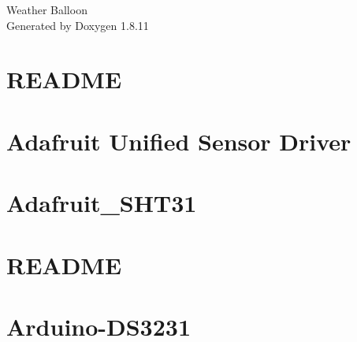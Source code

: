 \documentclass[twoside]{book}
\newcommand{\+}{\discretionary{\mbox{\scriptsize$\hookleftarrow$}}{}{}}
\newcommand{\clearemptydoublepage}{%
  \newpage{\pagestyle{empty}\cleardoublepage}%
}
\begin{document}
\hypersetup{pageanchor=false,
             bookmarksnumbered=true,
             pdfencoding=unicode
            }
\begin{titlepage}
\vspace*{7cm}
\begin{center}%
{\Large Weather Balloon }\\
\vspace*{1cm}
{\large Generated by Doxygen 1.8.11}\\
\end{center}
\end{titlepage}
\clearemptydoublepage
\tableofcontents
\clearemptydoublepage
{}
\hypersetup{pageanchor=true}

\chapter{R\+E\+A\+D\+ME}
\label{md_Weather_Balloon_library_Adafruit_ADXL345-master_README}
\hypertarget{md_Weather_Balloon_library_Adafruit_ADXL345-master_README}{}

\chapter{Adafruit Unified Sensor Driver}
\label{md_Weather_Balloon_library_Adafruit_Sensor-master_README}
\hypertarget{md_Weather_Balloon_library_Adafruit_Sensor-master_README}{}

\chapter{Adafruit\+\_\+\+S\+H\+T31}
\label{md_Weather_Balloon_library_Adafruit_SHT31-master_README}
\hypertarget{md_Weather_Balloon_library_Adafruit_SHT31-master_README}{}

\chapter{R\+E\+A\+D\+ME}
\label{md_Weather_Balloon_library_Adafruit_TSL2561-master_README}
\hypertarget{md_Weather_Balloon_library_Adafruit_TSL2561-master_README}{}

\chapter{Arduino-\/\+D\+S3231}
\label{md_Weather_Balloon_library_Arduino-DS3231-master_README}
\hypertarget{md_Weather_Balloon_library_Arduino-DS3231-master_README}{}

\end{document}
